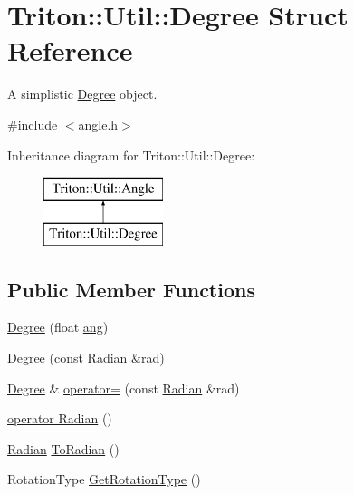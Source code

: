 \hypertarget{struct_triton_1_1_util_1_1_degree}{}\section{Triton\+:\+:Util\+:\+:Degree Struct Reference}
\label{struct_triton_1_1_util_1_1_degree}


A simplistic \hyperlink{struct_triton_1_1_util_1_1_degree}{Degree} object.  




{\ttfamily \#include $<$angle.\+h$>$}

Inheritance diagram for Triton\+:\+:Util\+:\+:Degree\+:\begin{figure}[H]
\begin{center}
\leavevmode
\includegraphics[height=2.000000cm]{struct_triton_1_1_util_1_1_degree}
\end{center}
\end{figure}
\subsection*{Public Member Functions}
\begin{DoxyCompactItemize}
\item 
\hyperlink{struct_triton_1_1_util_1_1_degree_a1775e5cc6bd96b15dbab56e2a6a6daf6}{Degree} (float \hyperlink{struct_triton_1_1_util_1_1_angle_af7d7f20a28c150b09776a35bc1dae0c4}{ang})
\item 
\hyperlink{struct_triton_1_1_util_1_1_degree_aa380efe33bd325c67dd08c3c73404901}{Degree} (const \hyperlink{struct_triton_1_1_util_1_1_radian}{Radian} \&rad)
\item 
\hyperlink{struct_triton_1_1_util_1_1_degree}{Degree} \& \hyperlink{struct_triton_1_1_util_1_1_degree_a74ad31a41cdc3ea6c0b6fdd3949a3411}{operator=} (const \hyperlink{struct_triton_1_1_util_1_1_radian}{Radian} \&rad)
\item 
\hyperlink{struct_triton_1_1_util_1_1_degree_aba55c9e80b400d129fda6596fdf26d5a}{operator Radian} ()
\item 
\hyperlink{struct_triton_1_1_util_1_1_radian}{Radian} \hyperlink{struct_triton_1_1_util_1_1_degree_ab1a544079c563045d5ddedae4ca52ca4}{To\+Radian} ()
\item 
Rotation\+Type \hyperlink{struct_triton_1_1_util_1_1_degree_a31e2a2094c705e9195c1e8f076aa690d}{Get\+Rotation\+Type} ()
\end{DoxyCompactItemize}
